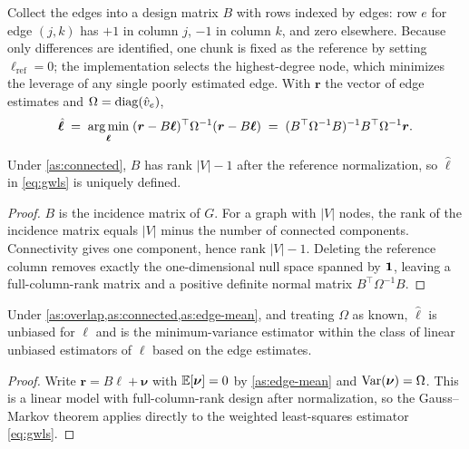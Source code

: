 \documentclass[12pt,a4paper,oneside]{article}
\begin{document}
Collect the edges into a design matrix $B$ with rows indexed by edges: row $e$
for edge $(j,k)$ has $+1$ in column $j$, $-1$ in column $k$, and zero elsewhere.
Because only differences are identified, one chunk is fixed as the reference by
setting $\ell_{\mathrm{ref}} = 0$; the implementation selects the
highest-degree node, which minimizes the leverage of any single poorly estimated
edge. With $\bm{r}$ the vector of edge estimates and
$\Omega = \operatorname{diag}(\hat{v}_e)$,
\begin{equation}
\hat{\bm{\ell}} \;=\; \operatorname*{arg\,min}_{\bm{\ell}}\;
(\bm{r} - B\bm{\ell})^{\top}\Omega^{-1}(\bm{r} - B\bm{\ell})
\;=\; (B^{\top}\Omega^{-1}B)^{-1}B^{\top}\Omega^{-1}\bm{r}.
\label{eq:gwls}
\end{equation}

\begin{proposition}[Identification]\label{prop:ident}
Under \cref{as:connected}, $B$ has rank $|V| - 1$ after the reference
normalization, so $\hat{\bm{\ell}}$ in \eqref{eq:gwls} is uniquely defined.
\end{proposition}

\begin{proof}
$B$ is the incidence matrix of $G$. For a graph with $|V|$ nodes, the rank of
the incidence matrix equals $|V|$ minus the number of connected components.
Connectivity gives one component, hence rank $|V|-1$. Deleting the reference
column removes exactly the one-dimensional null space spanned by $\bm{1}$, leaving
a full-column-rank matrix and a positive definite normal matrix
$B^{\top}\Omega^{-1}B$.
\end{proof}

\begin{proposition}\label{prop:gwls}
Under \cref{as:overlap,as:connected,as:edge-mean}, and treating $\Omega$ as
known, $\hat{\bm{\ell}}$ is unbiased for $\bm{\ell}$ and is the minimum-variance
estimator within the class of linear unbiased estimators of $\bm{\ell}$ based on
the edge estimates.
\end{proposition}

\begin{proof}
Write $\bm{r} = B\bm{\ell} + \bm{\nu}$ with $\mathbb{E}[\bm{\nu}] = 0$ by
\cref{as:edge-mean} and $\operatorname{Var}(\bm{\nu}) = \Omega$. This is a linear model with
full-column-rank design after normalization, so the Gauss--Markov theorem
applies directly to the weighted least-squares estimator \eqref{eq:gwls}.
\end{proof}
\end{document}
